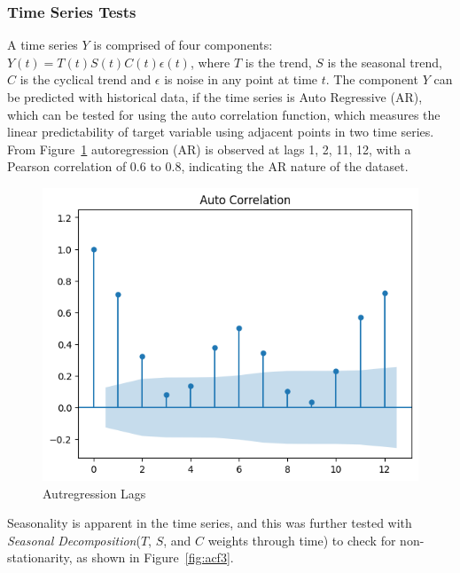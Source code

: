 \documentclass{ieeeaccess}
\begin{document}
\subsubsection{Time Series Tests}
A time series $Y$ is comprised of four components: $Y(t)=T(t)S(t)C(t)\epsilon(t)$, where $T$ is the trend, $S$ is the seasonal trend, $C$ is the cyclical trend and $\epsilon$ is noise in any point at time $t$. 
The component $Y$ can be predicted with historical data, if the time series is Auto Regressive (AR), which can be tested for using the auto correlation function, which measures the linear predictability of target variable using adjacent points in two time series. From Figure~\ref{fig:acf1} autoregression (AR) is observed at lags 1, 2, 11, 12, with a Pearson correlation of 0.6 to 0.8, indicating the AR nature of the dataset.
\begin{figure}[htb]
    \centering
    \includegraphics[width=\columnwidth]{data_analysis/acf1.png}
    \caption{Autregression Lags}
    \label{fig:acf1}
\end{figure}
Seasonality is apparent in the time series, and this was further tested with \textit{Seasonal Decomposition}($T$, $S$, and $C$ weights through time) to check for non-stationarity, as shown in Figure~\ref{fig:acf3}.
\end{document}
